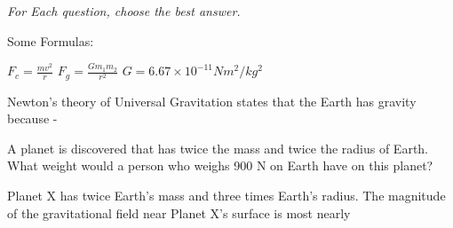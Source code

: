 \documentclass[10pt]{examdesign}
\begin{document}
\begin{multiplechoice} [title={Multiple Choice},
	rearrange=no]

\textit{For Each question, choose the best answer.}

	Some Formulas: 
	\begin{center}
	$F_c = \frac{mv^2}{r} $	\hspace{1 in} $F_g = \frac{Gm_1m_2}{r^2}$ \hspace{1in} $G = 6.67\times 10^{-11}Nm^2/kg^2 $
	\vspace{0.1in}
\end{center}	
	


	

\begin{question}
Newton's theory of Universal Gravitation states that the Earth has gravity because - 
\end{question}

\begin{question}
A planet is discovered that has twice the mass and twice the radius of Earth.  What weight would a person who weighs 900 N on Earth have on this planet?
\end{question}


\begin{question}
Planet X has twice Earth's mass and three times Earth's radius.  The magnitude of the gravitational field near Planet X's surface is most nearly 
\end{question}

%	


\end{multiplechoice}
\end{document}
